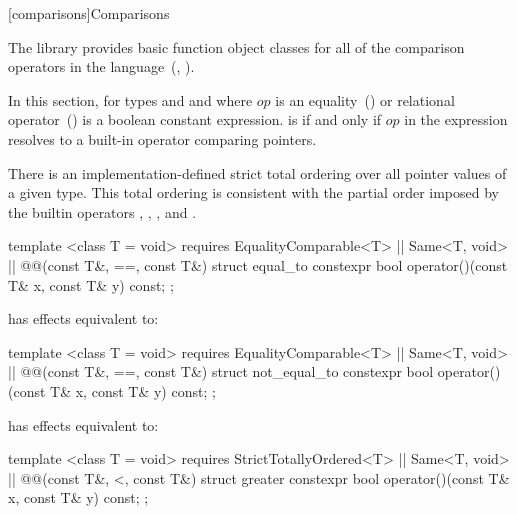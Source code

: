 [comparisons]{Comparisons}

\pnum
The library provides basic function object classes for all of the comparison
operators in the language~(, ).

\pnum
In this section,  for types 
and  and where $op$ is an equality~() or relational
operator~() is a boolean constant expression.
 is  if and only if $op$
in the expression  resolves to a built-in
operator comparing pointers.

\pnum
There is an implementation-defined strict total ordering over all pointer values
of a given type. This total ordering is consistent with the partial order imposed
by the builtin operators \tcode{<}, \tcode{>}, \tcode{<=}, and \tcode{>=}.

%
\begin{itemdecl}
template <class T = void>
  requires EqualityComparable<T> || Same<T, void> || @\textit{}@(const T&, ==, const T&)
struct equal_to {
  constexpr bool operator()(const T& x, const T& y) const;
};
\end{itemdecl}

\begin{itemdescr}
\pnum
{} has effects equivalent to: 
\end{itemdescr}

%
\begin{itemdecl}
template <class T = void>
  requires EqualityComparable<T> || Same<T, void> || @\textit{}@(const T&, ==, const T&)
struct not_equal_to {
  constexpr bool operator()(const T& x, const T& y) const;
};
\end{itemdecl}

\begin{itemdescr}
\pnum
{} has effects equivalent to: 
\end{itemdescr}

%
\begin{itemdecl}
template <class T = void>
  requires StrictTotallyOrdered<T> || Same<T, void> || @\textit{}@(const T&, <, const T&)
struct greater {
  constexpr bool operator()(const T& x, const T& y) const;
};
\end{itemdecl}

